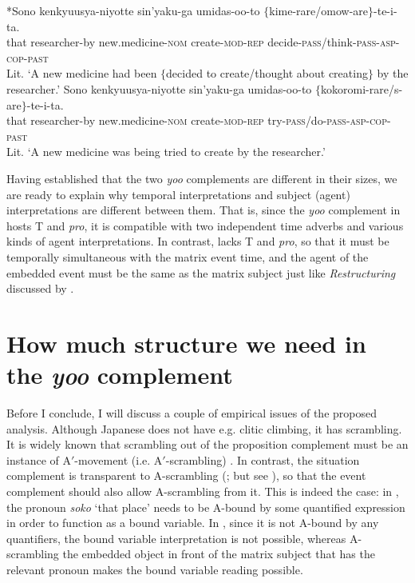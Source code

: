 \documentclass[output=paper]{langsci/langscibook}
\begin{document}
\ea\label{shimamu28}
\begin{xlist} 
\ex\label{shimamu28a} \hspace{-1.5mm}*{\gll Sono kenkyuusya-niyotte sin'yaku-ga umidas-oo-to $\{$kime-rare/omow-are$\}$-te-i-ta.\\
that researcher-by new.medicine-\textsc{nom} create-\textsc{mod-rep} \phantom{$\{$}decide-\textsc{pass}/think-\textsc{pass}-\textsc{asp-cop-past}\\
\glt Lit. `A new medicine had been $\{$decided to create/thought about creating$\}$ by the researcher.'}
\ex\label{shimamu28b}\gll Sono kenkyuusya-niyotte sin'yaku-ga umidas-oo-to $\{$kokoromi-rare/s-are$\}$-te-i-ta.\\
that researcher-by new.medicine-\textsc{nom} create-\textsc{mod-rep} \phantom{$\{$}try-\textsc{pass}/do-\textsc{pass}-\textsc{asp-cop-past}\\
\glt Lit. `A new medicine was being tried to create by the researcher.'
\end{xlist}
\z 
Having established that the two \textit{yoo} complements are different in their sizes, we are ready to explain why temporal interpretations and subject (agent) interpretations are different between them. That is, since the \textit{yoo} complement in  hosts T and \textit{pro}, it is compatible with two independent time adverbs and various kinds of agent interpretations. In contrast,  lacks T and \textit{pro}, so that it must be temporally simultaneous with the matrix event time, and the agent of the embedded event must be the same as the matrix subject just like \textit{Restructuring} discussed by \citet{wurmbrand2001}.

\section{How much structure we need in the \textit{yoo} complement}\label{shimamuS5}
Before I conclude, I will discuss a couple of empirical issues of the proposed analysis. Although Japanese does not have e.g. clitic climbing, it has scrambling. It is widely known that scrambling out of the proposition complement must be an instance of A$'$-movement (i.e. A$'$-scrambling) \citep[][among many others]{saito1992}. In contrast, the situation complement is transparent to A-scrambling (\citealt{nemoto1991}; but see \citealt{takano2010}), so that the event complement should also allow A-scrambling from it. This is indeed the case: in , the pronoun \textit{soko} `that place' needs to be A-bound by some quantified expression in order to function as a bound variable. In , since it is not A-bound by any quantifiers, the bound variable interpretation is not possible, whereas A-scrambling the embedded object in front of the matrix subject that has the relevant pronoun makes the bound variable reading possible.
\end{document}
